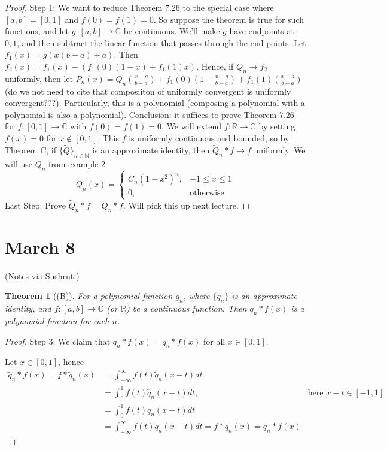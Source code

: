 \documentclass{article}
\theoremstyle{plain}
\newtheorem{theorem}{Theorem}
\theoremstyle{remark}
\newcommand{\N}{{\mathbb N}}
\newcommand{\R}{{\mathbb R}}
\newcommand{\C}{{\mathbb C}}
\begin{document}
\begin{proof}
	Step 1: We want to reduce Theorem 7.26 to the special case
	where $[a,b] = [0,1]$ and $f(0) = f(1) = 0$.
	So suppose the theorem is true for such functions,
	and let $g \colon [a,b] \to \C$ be continuous.
	We'll make $g$ have endpoints at $0,1$,
	and then subtract the linear function that passes through the end points.
	Let $f_1(x) = g(x(b-a)+a)$.
	Then $f_2(x) = f_1(x) - (f_1(0)(1-x) + f_1(1)x)$.
	Hence, if $Q_n \to f_2$ uniformly,
	then let $P_n(x) = Q_n\left(\frac{x-a}{b-a}\right) +
	f_1(0)\left(1-\frac{x-a}{b-a}\right) + f_1(1)\left(\frac{x-a}{b-a}\right)$
	(do we not need to cite that composiiton of uniformly convergent is uniformly convergent???).
	Particularly, this is a polynomial
	(composing a polynomial with a polynomial is also a polynomial).
	Conclusion: it suffices to prove Theorem 7.26
	for $f \colon [0,1] \to \C$ with $f(0) = f(1) = 0$.
	We will extend $f \colon \R \to \C$ by setting $f(x) = 0$
	for $x \not\in [0,1]$.
	This $f$ is uniformly continuous and bounded,
	so by Theorem C, if $\{\tilde{Q}\}_{n\in\N}$ is an approximate identity,
	then $\tilde{Q}_n * f \to f$ uniformly.
	We will use $\tilde{Q}_n$ from example 2
	\[
		\tilde{Q}_n(x) = \begin{cases} C_n(1-x^2)^n, & -1 \leq x \leq 1\\
		0, &\text{otherwise}\end{cases}
	\]
	Last Step: Prove $\tilde{Q}_n* f = Q_n * f$.
	Will pick this up next lecture.
\end{proof}


\section{March 8}
(Notes via Sushrut.)

\begin{theorem}[(B)]
	For a polynomial function $g_n$, where $\{q_n\}$ is an approximate identity,
	and $f \colon [a,b] \to \C$ (or $\R$) be a continuous function.
	Then $q_n * f(x)$ is a polynomial function for each $n$.
\end{theorem}
\begin{proof}
	Step 3: We claim that $\tilde{q}_n * f(x) = q_n * f(x)$ for all $x \in [0,1]$.

	Let $x \in [0,1]$, hence
	\begin{align*}
		\tilde{q}_n*f(x) = f * \tilde{q}_n(x)
		&= \int_{-\infty}^\infty f(t)\tilde{q}_n(x-t)dt\\
		&= \int_0^1 f(t)\tilde{q}_n(x-t)dt, & \text{here }x-t \in [-1,1]\\
		&= \int_0^1 f(t)q_n(x-t)dt\\
		&= \int_{-\infty}^\infty f(t)q_n(x-t)dt = f*q_n(x) = q_n*f(x)
	\end{align*}
\end{proof}
\end{document}
